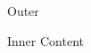 \documentclass[icons=false]{yuan2resume}
\begin{document}
\begin{cvtwocolumn}
  \begin{cvsection}{Outer}
    \begin{cvsection}{Inner}
      Content
    \end{cvsection}
  \end{cvsection}
\end{cvtwocolumn}
\end{document}
